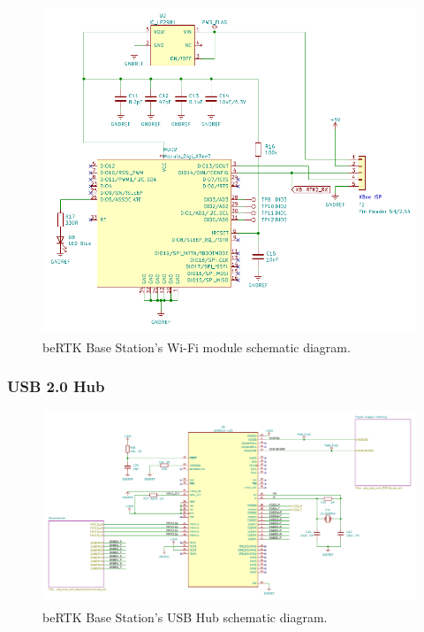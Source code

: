 \begin{figure}[h]
	\centering
	\includegraphics[width=1.0\textwidth]{Chapters/Figures/chapter3/Modules_XBEE3.pdf}
	\caption{beRTK\textsuperscript{\textregistered} Base Station's Wi-Fi module schematic diagram.}
	\label{fig:XBEE3_circuit}
\end{figure}


\subsubsection{USB 2.0 Hub}\label{sec:3234_LAN9514}

\begin{figure}[h]
	\centering
	\includegraphics[width=1.0\textwidth]{Chapters/Figures/chapter3/USB_Hub_1.pdf}
	\caption{beRTK\textsuperscript{\textregistered} Base Station's USB Hub schematic diagram.}
	\label{fig:USB_Hub_1_circuit}
\end{figure}

